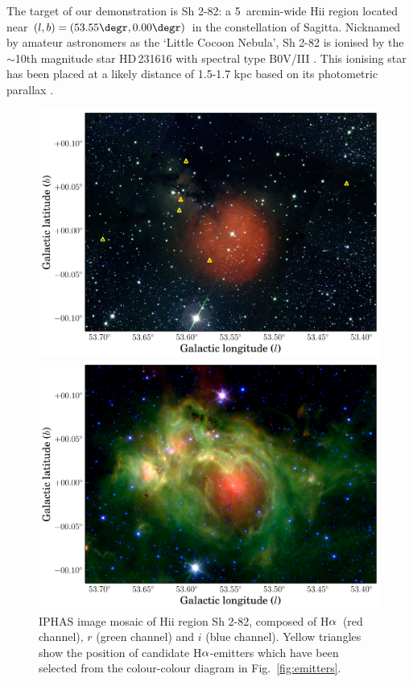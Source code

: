 \documentclass[a4paper,useAMS,usenatbib]{mn2e}
\def\ha{\mbox{H$\rm \alpha$}}
\begin{document}
The target of our demonstration is Sh 2-82:
a 5~arcmin-wide H{\sc ii} region located near $(l,b)=(53.55\degr, 0.00\degr)$
in the constellation of Sagitta.
Nicknamed by amateur astronomers as the `Little Cocoon Nebula',
Sh 2-82 is ionised by 
the $\sim$10th magnitude star HD\,231616
with spectral type B0V/III
\citep{Georgelin1973,Mayer1973,Hunter1990}.
This ionising star has been placed 
at a likely distance of 1.5-1.7 kpc
based on its photometric parallax
\citep{Mayer1973,Lahulla1985,Hunter1990}.

\begin{figure}
    \begin{minipage}[b]{0.8\linewidth}
        \includegraphics[width=\textwidth]{figures/sh2-82/sh2-82-iphas.jpg} 
    \end{minipage}
\caption{IPHAS image mosaic of H{\sc ii} region Sh 2-82,
composed of \ha\ (red channel), $r$ (green channel) and $i$ (blue channel). Yellow triangles show the position of candidate \ha-emitters
which have been selected from the colour-colour diagram
in Fig.~\ref{fig:emitters}. 
}
\label{fig:mosaic_iphas}
    \begin{minipage}[b]{0.8\linewidth}
        \includegraphics[width=\textwidth]{figures/sh2-82/sh2-82-spitzer.jpg} 

\end{minipage}
\end{figure}
\end{document}
